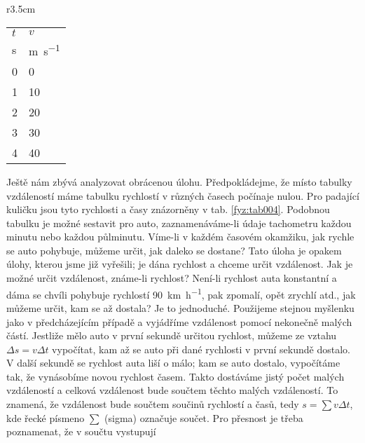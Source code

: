     \begin{wraptable}[13]{r}{3.5cm}      %
      \centering
      \begin{tabular}{>{\centering\arraybackslash}p{2em}|>{\centering\arraybackslash}p{3em}}
        \hline  \(t\)    & \(v\)          \\
                 \si{\s} & \si{\m\per\s}  \\
         \hline  \num{0} & \num{0}        \\
                 \num{1} & \num{10}       \\
                 \num{2} & \num{20}       \\
                 \num{3} & \num{30}       \\
                 \num{4} & \num{40}       \\
        \hline 
      \end{tabular}
      \caption{Rychlost padajícího tělesa (\cite[s.~115]{Feynman01})}
      \label{fyz:tab004}
    \end{wraptable}
    Ještě nám zbývá analyzovat obrácenou úlohu. Předpokládejme, že místo tabulky vzdáleností máme 
    tabulku rychlostí v různých časech počínaje nulou. Pro padající kuličku jsou tyto rychlosti a 
    časy znázorněny v tab. \ref{fyz:tab004}. Podobnou tabulku je možné sestavit pro auto, 
    zaznamenáváme-li údaje tachometru každou minutu nebo každou půlminutu. Víme-li v každém časovém 
    okamžiku, jak rychle se auto pohybuje, můžeme určit, jak daleko se dostane? Tato úloha je 
    opakem úlohy, kterou jsme již vyřešili; je dána rychlost a chceme určit vzdálenost. Jak je 
    možné určit vzdálenost, známe-li rychlost? Není-li rychlost auta konstantní a dáma se chvíli 
    pohybuje rychlostí \SI{90}{\km\per\hour}, pak zpomalí, opět zrychlí atd., jak můžeme určit, kam 
    se až dostala? Je to jednoduché. Použijeme stejnou myšlenku jako v předcházejícím případě a 
    vyjádříme vzdálenost pomocí nekonečně malých částí. Jestliže mělo auto v první sekundě určitou 
    rychlost, můžeme ze vztahu \(\Delta s = v\Delta t\) vypočítat, kam až se auto při dané 
    rychlosti v první sekundě dostalo. V další sekundě se rychlost auta liší o málo; kam se auto 
    dostalo, vypočítáme tak, že vynásobíme novou rychlost časem. Takto dostáváme jistý počet malých 
    vzdáleností a celková vzdálenost bude součtem těchto malých vzdáleností. To znamená, že 
    vzdálenost bude součtem součinů rychlostí a časů, tedy \(s=\sum v\Delta t\), kde řecké písmeno 
    \(\sum\) (sigma) označuje součet. Pro přesnost je třeba poznamenat, že v součtu vystupují 
